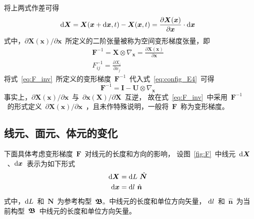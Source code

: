 \begin{enumerate}
将上两式作差可得
\begin{equation}
	\mathop{}\!\mathrm{d} \bm{X}=\bm{X} (\bm{x}+\mathop{}\!\mathrm{d} \bm{x},t)-\bm{X} (\bm{x},t)=
	\frac{\partial \bm{X} (\bm{x})}{\partial \bm{x}} \cdot \mathop{}\!\mathrm{d} \bm{x}
\end{equation}
式中，${\partial \bm{X} (\bm{x})}/{\partial \bm{x}}$~所定义的二阶张量被称为空间变形梯度张量，即
\begin{subequations}\label{eq:F_inv}
	\begin{gather}
	\bm{F}^{-1} = \bm{X} \otimes \nabla_{\bm{x}} = \frac{\partial \bm{X} (\bm{x})}{\partial \bm{x}} \\
	F^{-1}_{ij} = \frac{\partial X_i}{\partial x_j}
	\end{gather}
\end{subequations}
将式~\eqref{eq:F_inv}~所定义的变形梯度~$\bm{F}^{-1}$~代入式~\eqref{eq:config_E4}~可得
\begin{equation}\label{eq:trans_u2}
	\bm{F}^{-1}=\bm{I}-\bm{U} \otimes \nabla_{\bm{x}}
\end{equation}
事实上，${\partial \bm{X} (\bm{x})}/{\partial \bm{x}}$~与~${\partial \bm{x} (\bm{X})}/{\partial \bm{X}}$~互逆，
故在式~\eqref{eq:F_inv}~中采用~$\bm{F}^{-1}$~的形式定义~${\partial \bm{X} (\bm{x})}/{\partial \bm{x}}$~，且未作特殊说明，一般将~$\bm{F}$~称为变形梯度。
\end{enumerate}

\subsection{线元、面元、体元的变化}\label{content:dl}
下面具体考虑变形梯度~$\bm{F}$~对线元的长度和方向的影响，
设图~\ref{fig:F}~中线元~$\mathop{}\!\mathrm{d} \bm{X}$~、$\mathop{}\!\mathrm{d} \bm{x}$~表示为如下形式
\begin{subequations}\label{eq:dL}
	\begin{align}
	\mathop{}\!\mathrm{d} \bm{X} & =\mathop{}\!\mathrm{d} L ~\hat{\bm{N}} \\
	\mathop{}\!\mathrm{d} \bm{x} & =\mathop{}\!\mathrm{d} l ~\hat{\bm{n}} \label{eq:dL2}
	\end{align}
\end{subequations}
式中，$\mathop{}\!\mathrm{d} L$~和~$\hat{\bm{N}}$~为参考构型~$\bm{\mathfrak{B}}_{\scriptscriptstyle 0}$~中线元的长度和单位方向矢量，
$\mathop{}\!\mathrm{d} l$~和~$\hat{\bm{n}}$~为当前构型~$\bm{\mathfrak{B}}$~中线元的长度和单位方向矢量。

